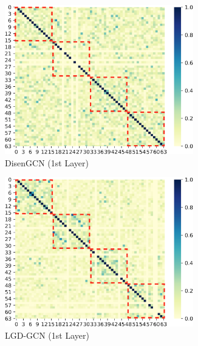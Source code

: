 \documentclass[accepted]{uai2021} %
\begin{document}
\begin{figure}[t]
    \centering
    \begin{subfigure}[b]{0.235\textwidth}
        \centering
        \includegraphics[width=0.9\textwidth]{1stlayer_disengcn.png}
        \caption{DisenGCN (1st Layer)}\label{fig:1L_disengcn}
    \end{subfigure}
    \hfill
    \begin{subfigure}[b]{0.235\textwidth}
        \centering
        \includegraphics[width=0.9\textwidth]{1stlayer_2nd.png}
        \caption{LGD-GCN (1st Layer)}\label{fig:1L_lgd2nd}
    \end{subfigure}
    \hfill
    \begin{subfigure}[b]{0.235\textwidth}
        \centering

\end{subfigure}
\end{figure}
\end{document}

